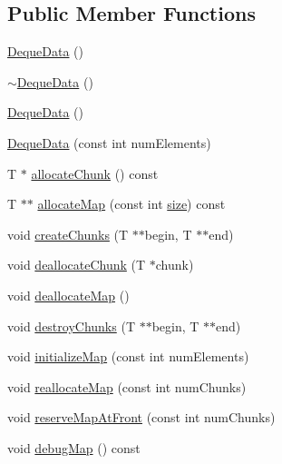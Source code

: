 \subsection*{Public Member Functions}
\begin{DoxyCompactItemize}
\item 
\hyperlink{structprism_1_1containers_1_1_deque_data_a6df573bc442a362759d91e5422134fe2}{Deque\+Data} ()
\item 
\hyperlink{structprism_1_1containers_1_1_deque_data_a4205ff519915ff541bbadcd04ae51445}{$\sim$\+Deque\+Data} ()
\item 
\hyperlink{structprism_1_1containers_1_1_deque_data_a6df573bc442a362759d91e5422134fe2}{Deque\+Data} ()
\item 
\hyperlink{structprism_1_1containers_1_1_deque_data_acfca954633c170f1a7fa7faacb013d6d}{Deque\+Data} (const int num\+Elements)
\item 
T $\ast$ \hyperlink{structprism_1_1containers_1_1_deque_data_a0ada47425797d68443f27823bfa08cea}{allocate\+Chunk} () const 
\item 
T $\ast$$\ast$ \hyperlink{structprism_1_1containers_1_1_deque_data_a269638b0bd962c93931c5898482b4f44}{allocate\+Map} (const int \hyperlink{structprism_1_1containers_1_1_deque_data_a1c56f1c017d760cadb912ae82fc5722a}{size}) const 
\item 
void \hyperlink{structprism_1_1containers_1_1_deque_data_a850f8ec25965cf841dd64a97d2e77f40}{create\+Chunks} (T $\ast$$\ast$begin, T $\ast$$\ast$end)
\item 
void \hyperlink{structprism_1_1containers_1_1_deque_data_a6fdfcbf7075005a085405b7ec0ae210e}{deallocate\+Chunk} (T $\ast$chunk)
\item 
void \hyperlink{structprism_1_1containers_1_1_deque_data_aaae5b68eaa8045c9a299daf457fe2a1f}{deallocate\+Map} ()
\item 
void \hyperlink{structprism_1_1containers_1_1_deque_data_a688c8749c8ccab76a351192743c1d557}{destroy\+Chunks} (T $\ast$$\ast$begin, T $\ast$$\ast$end)
\item 
void \hyperlink{structprism_1_1containers_1_1_deque_data_ae17c6cb94116e58431aab0ca0d94b41e}{initialize\+Map} (const int num\+Elements)
\item 
void \hyperlink{structprism_1_1containers_1_1_deque_data_ab27311b60cdca11069661aa4a5233958}{reallocate\+Map} (const int num\+Chunks)
\item 
void \hyperlink{structprism_1_1containers_1_1_deque_data_a134621784e64e855754d187c4babd03c}{reserve\+Map\+At\+Front} (const int num\+Chunks)
\item 
void \hyperlink{structprism_1_1containers_1_1_deque_data_a66b8f37117266f764d5ea3f60ee4a948}{debug\+Map} () const 
\end{DoxyCompactItemize}
